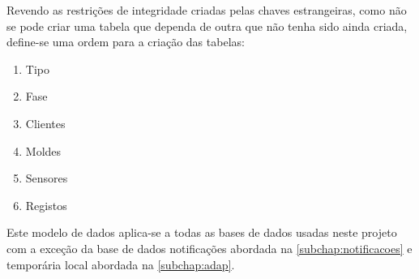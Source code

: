 \documentclass[11pt,twoside,a4paper]{report}
\begin{document}
\newpage
Revendo as restrições de integridade criadas pelas chaves estrangeiras, como não se pode criar uma tabela que dependa de outra que não tenha sido ainda criada, define-se uma ordem para a criação das tabelas:
\begin{enumerate}[noitemsep]
	\item Tipo
	\item Fase
	\item Clientes
	\item Moldes
	\item Sensores
	\item Registos
\end{enumerate}
Este modelo de dados aplica-se a todas as bases de dados usadas neste projeto com a exceção da base de dados notificações abordada na \autoref{subchap:notificacoes} e temporária local abordada na \autoref{subchap:adap}.
\end{document}
